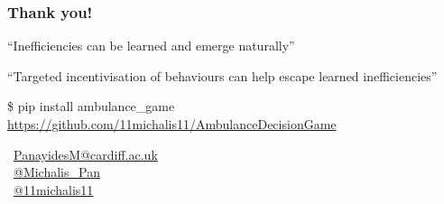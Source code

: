 \begin{frame}
    \frametitle{Thank you!}
    \centering

    \large
    ``Inefficiencies can be learned and emerge naturally''

    \vspace{0.5cm}

    ``Targeted incentivisation of behaviours can help escape learned inefficiencies''

    \vspace{1.5cm}
    \small{\$ pip install ambulance\_game}
    \small{\url{https://github.com/11michalis11/AmbulanceDecisionGame}}


    \vspace{1.5cm}
    \faEnvelope \, \url{PanayidesM@cardiff.ac.uk} \\
    \faTwitterSquare \, \url{@Michalis_Pan} \\
    \faGithubSquare \, \url{@11michalis11} \\

\end{frame}


